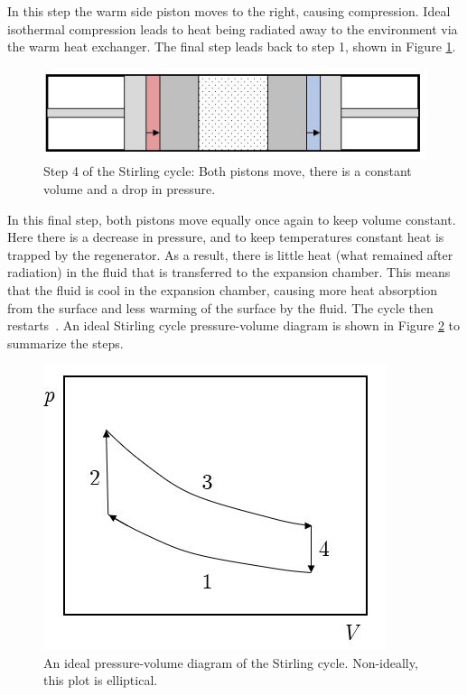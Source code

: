 In this step the warm side piston moves to the right, causing compression. Ideal isothermal compression leads to heat being radiated away to the environment via the warm heat exchanger. The final step leads back to step 1, shown in Figure \ref{fig:stirling_cycle_part_4}.

\begin{figure}[h]
\centering
  \includegraphics[width=0.8\linewidth]{chap2_images/stirling_process_heat_transfer.JPG}
  \caption{Step 4 of the Stirling cycle: Both pistons move, there is a constant volume and a drop in pressure.}
  \label{fig:stirling_cycle_part_4}
\end{figure}

In this final step, both pistons move equally once again to keep volume constant. Here there is a decrease in pressure, and to keep temperatures constant heat is trapped by the regenerator. As a result, there is little heat (what remained after radiation) in the fluid that is transferred to the expansion chamber. This means that the fluid is cool in the expansion chamber, causing more heat absorption from the surface and less warming of the surface by the fluid. The cycle then restarts~\citep{cryocoolers}. An ideal Stirling cycle pressure-volume diagram is shown in Figure \ref{fig:stirling_cycle} to summarize the steps.

\begin{figure}[h]
\centering
  \includegraphics[width=0.5\linewidth]{chap2_images/stirling_cycle.JPG}
  \caption{An ideal pressure-volume diagram of the Stirling cycle. Non-ideally, this plot is elliptical.}
  \label{fig:stirling_cycle}
\end{figure}


